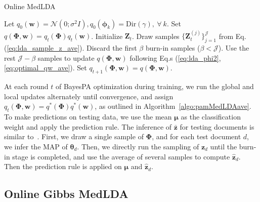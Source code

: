 \documentclass[twoside,11pt]{article}
\newcommand{\zv}{\bm{z}}
\newcommand{\Zv}{\bm{Z}}
\newcommand{\wv}{\bm{w}}
\newcommand{\thetav}{\bm{\theta}}
\newcommand{\phiv}{\bm{\phi}}
\newcommand{\Phiv}{\bm{\Phi}}
\newcommand{\muv}{\bm \mu}
\newcommand{\barzv}{\bm{\bar{z}}}
\begin{document}
\begin{algorithm}[t]
\caption{\small{Online MedLDA}}
\label{algo:pamMedLDAave}
\begin{algorithmic}[1]
\STATE Let $q_0(\wv) = \mathcal{N}(0; \sigma^2 I), q_0(\phiv_k) = \text{Dir}(\gamma), ~\forall~ k$.
\STATE Set $q(\Phiv, \wv) = q_t(\Phiv) q_t(\wv)$. Initialize $\bm{Z}_t$.
\STATE Draw samples $\{\Zv_t^{(j)}\}_{j=1}^{\mathcal{J}}$ from  Eq. (\ref{eq:lda_sample_z_ave}).
\STATE Discard the first $\beta$ burn-in samples ($\beta < \mathcal{J}$).
\STATE Use the rest $\mathcal{J}-\beta$ samples to update $q(\Phiv, \wv)$ following Eq.s (\ref{eq:lda_phi2}, \ref{eq:optimal_qw_ave}).
\ENDFOR
\STATE Set $q_{t+1}(\Phiv, \wv) = q(\Phiv, \wv)$.
\ENDFOR
\end{algorithmic}
\end{algorithm}

At each round $t$ of BayesPA optimization during training, we run the global and local updates alternately until convergence, and assign $q_t(\Phiv, \wv) = q^*(\Phiv)q^*(\wv)$, as outlined in Algorithm~\ref{algo:pamMedLDAave}. To make predictions on testing data, we use the mean $\muv$ as the classification weight and apply the prediction rule. The inference of $\barzv$ for testing documents is similar to~\citet{zhugibbs2013}. First, we draw a single sample of $\Phiv$, and for each test document $d$, we infer the MAP of $\thetav_d$. Then, we directly run the sampling of $\zv_d$ until the burn-in stage is completed, and use the average of several samples to compute $\widehat{\zv}_d$. Then the prediction rule is applied on $\muv$ and $\widehat{\zv}_d$.




\subsection{Online Gibbs MedLDA}\label{sec:gibbsmedlda}
\end{document}
